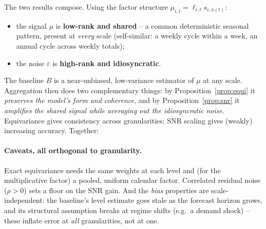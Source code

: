 \documentclass[11pt]{article}
\theoremstyle{plain}
\theoremstyle{remark}
\begin{document}
The two results compose. Using the factor structure $\mu_{i,t}=\ell_{i,t}s_{i,\phi(t)}$:
\begin{itemize}
\item the signal $\mu$ is \textbf{low-rank and shared} -- a common deterministic
  seasonal pattern, present at \emph{every} scale (self-similar: a weekly cycle
  within a week, an annual cycle across weekly totals);
\item the noise $\varepsilon$ is \textbf{high-rank and idiosyncratic}.
\end{itemize}
The baseline $B$ is a near-unbiased, low-variance estimator of $\mu$ at any scale.
Aggregation then does two complementary things: by Proposition~\ref{prop:equi} it
\emph{preserves the model's form and coherence}, and by
Proposition~\ref{prop:snr} it \emph{amplifies the shared signal while averaging out
the idiosyncratic noise}. Equivariance gives consistency across granularities; SNR
scaling gives (weakly) increasing accuracy. Together:
\begin{center}
\end{center}

\paragraph{Caveats, all orthogonal to granularity.} Exact equivariance needs the
same weights at each level and (for the multiplicative factor) a pooled, uniform
calendar factor. Correlated residual noise ($\rho>0$) sets a floor on the
SNR gain. And the \emph{bias} properties are scale-independent: the baseline's level
estimate goes stale as the forecast horizon grows, and its structural assumption
breaks at regime shifts (e.g.\ a demand shock) -- these inflate error at \emph{all}
granularities, not at one.
\end{document}
